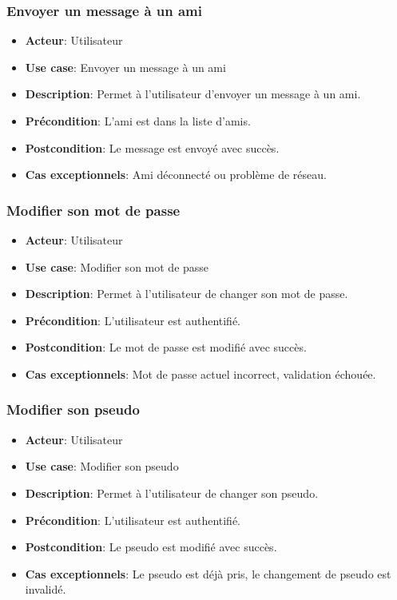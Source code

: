 \documentclass{article}
\begin{document}
\subsubsection*{Envoyer un message à un ami}
\begin{itemize}
    \item \textbf{Acteur}: Utilisateur
    \item \textbf{Use case}: Envoyer un message à un ami
    \item \textbf{Description}: Permet à l'utilisateur d'envoyer un message à un ami.
    \item \textbf{Précondition}: L'ami est dans la liste d'amis.
    \item \textbf{Postcondition}: Le message est envoyé avec succès.
    \item \textbf{Cas exceptionnels}: Ami déconnecté ou problème de réseau.
\end{itemize}

\subsubsection*{Modifier son mot de passe}
\begin{itemize}
    \item \textbf{Acteur}: Utilisateur
    \item \textbf{Use case}: Modifier son mot de passe
    \item \textbf{Description}: Permet à l'utilisateur de changer son mot de passe.
    \item \textbf{Précondition}: L'utilisateur est authentifié.
    \item \textbf{Postcondition}: Le mot de passe est modifié avec succès.
    \item \textbf{Cas exceptionnels}: Mot de passe actuel incorrect, validation échouée.
\end{itemize}

\subsubsection*{Modifier son pseudo}
\begin{itemize}
    \item \textbf{Acteur}: Utilisateur
    \item \textbf{Use case}: Modifier son pseudo
    \item \textbf{Description}: Permet à l'utilisateur de changer son pseudo.
    \item \textbf{Précondition}: L'utilisateur est authentifié.
    \item \textbf{Postcondition}: Le pseudo est modifié avec succès.
    \item \textbf{Cas exceptionnels}: Le pseudo est déjà pris, le changement de pseudo est invalidé.
\end{itemize}
\end{document}
